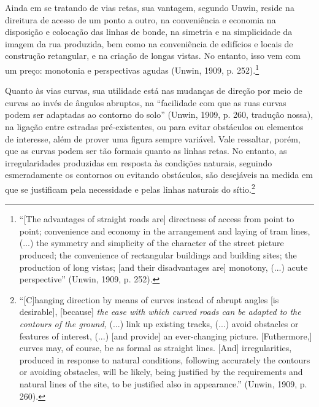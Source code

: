 \documentclass[12pt, a4paper]{book} %
\begin{document}
        Ainda em se tratando de vias retas, sua vantagem, segundo Unwin, reside na direitura de acesso de um ponto a outro, na conveniência e economia na disposição e colocação das linhas de bonde, na simetria e na simplicidade da imagem da rua produzida, bem como na conveniência de edifícios e locais de construção retangular, e na criação de longas vistas. No entanto, isso vem com um preço: monotonia e perspectivas agudas (Unwin, 1909, p. 252).\footnote[88]{``[The advantages of straight roads are] directness of access from point to point; convenience and economy in the arrangement and laying of tram lines, (...) the symmetry and simplicity of the character of the street picture produced; the convenience of rectangular buildings and building sites; the production of long vistas; [and their disadvantages are] monotony, (...) acute perspective'' (Unwin, 1909, p. 252).}
        
        Quanto às vias curvas, sua utilidade está nas mudanças de direção por meio de curvas ao invés de ângulos abruptos, na ``facilidade com que as ruas curvas podem ser adaptadas ao contorno do solo'' (Unwin, 1909, p. 260, tradução nossa), na ligação entre estradas pré-existentes, ou para evitar obstáculos ou elementos de interesse, além de prover uma figura sempre variável. Vale ressaltar, porém, que as curvas podem ser tão formais quanto as linhas retas. No entanto, as irregularidades produzidas em resposta às condições naturais, seguindo esmeradamente os contornos ou evitando obstáculos, são desejáveis na medida em que se justificam pela necessidade e pelas linhas naturais do sítio.\footnote[89]{``[C]hanging direction by means of curves instead of abrupt angles [is desirable], [because] \textit{the ease with which curved roads can be adapted to the contours of the ground,} (...) link up existing tracks, (...) avoid obstacles or features of interest, (...) [and provide] an ever-changing picture. [Futhermore,] curves may, of course, be as formal as straight lines. [And] irregularities, produced in response to natural conditions, following accurately the contours or avoiding obstacles, will be likely, being justified by the requirements and natural lines of the site, to be justified also in appearance.'' (Unwin, 1909, p. 260).}
\end{document}
